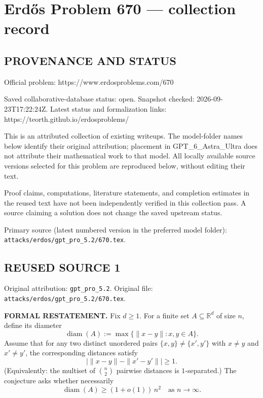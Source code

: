 \section*{Erd\H{o}s Problem 670 --- collection record}

\subsection*{PROVENANCE AND STATUS}
Official problem: https://www.erdosproblems.com/670

Saved collaborative-database status: open.
Snapshot checked: 2026-09-23T17:22:24Z.
Latest status and formalization links: https://teorth.github.io/erdosproblems/

This is an attributed collection of existing writeups. The model-folder names below identify their original attribution; placement in GPT\_6\_Astra\_Ultra does not attribute their mathematical work to that model. All locally available source versions selected for this problem are reproduced below, without editing their text.

Proof claims, computations, literature statements, and completion estimates in the reused text have not been independently verified in this collection pass. A source claiming a solution does not change the saved upstream status.

Primary source (latest numbered version in the preferred model folder): \texttt{attacks/erdos/gpt\_pro\_5.2/670.tex}.

\subsection*{REUSED SOURCE 1}
Original attribution: \texttt{gpt\_pro\_5.2}.
Original file: \texttt{attacks/erdos/gpt\_pro\_5.2/670.tex}.



\noindent\textbf{FORMAL RESTATEMENT.}
Fix $d\ge 1$.
For a finite set $A\subseteq\mathbb{R}^d$ of size $n$, define its diameter
\[\operatorname{diam}(A):=\max\{\|x-y\|: x,y\in A\}.
\]
Assume that for any two distinct unordered pairs $\{x,y\}\ne\{x',y'\}$ with $x\ne y$ and $x'\ne y'$, the corresponding distances satisfy
\[\big|\|x-y\| - \|x'-y'\|\big|\ge 1.
\]
(Equivalently: the multiset of $\binom{n}{2}$ pairwise distances is $1$-separated.)
The conjecture asks whether necessarily
\[
\operatorname{diam}(A) \ge (1+o(1))\, n^2\quad\text{as } n\to\infty.
\]

